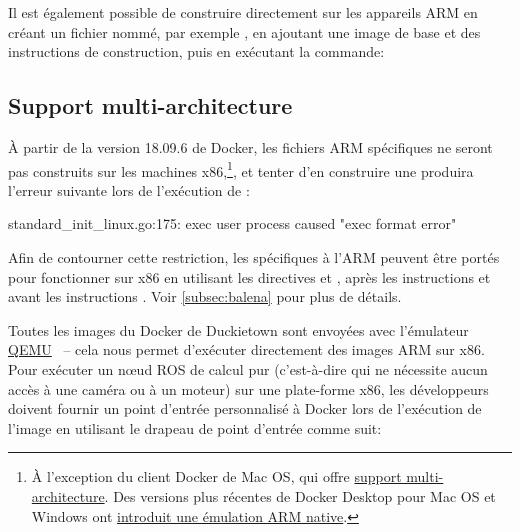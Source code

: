 %
Il est également possible de construire directement sur les appareils ARM en créant un fichier nommé, par exemple , en ajoutant une image de base et des instructions de construction, puis en exécutant la commande:

%
\subsection{Support multi-architecture}

À partir de la version 18.09.6 de Docker, les fichiers ARM spécifiques  ne seront pas construits sur les machines x86,\footnote{À l'exception du client Docker de Mac OS, qui offre \href{https://docs.docker.com/docker-for-mac/multi-arch/}{support multi-architecture}. Des versions plus récentes de Docker Desktop pour Mac OS et Windows ont \href{https://engineering.docker.com/2019/04/multi-arch-images/}{introduit une émulation ARM native}.}, et tenter d'en construire une produira l'erreur suivante lors de l'exécution de :

\begin{pclisting}
standard_init_linux.go:175: exec user process caused "exec format error"
\end{pclisting}
%
Afin de contourner cette restriction, les  spécifiques à l'ARM peuvent être portés pour fonctionner sur x86 en utilisant les directives  et , après les instructions  et avant les instructions . Voir \autoref{subsec:balena} pour plus de détails.

Toutes les images du Docker de Duckietown sont envoyées avec l'émulateur \href{https://www.qemu.org}{QEMU}~\citep{bellard2005qemu} -- cela nous permet d'exécuter directement des images ARM sur x86. Pour exécuter un nœud ROS de calcul pur (c'est-à-dire qui ne nécessite aucun accès à une caméra ou à un moteur) sur une plate-forme x86, les développeurs doivent fournir un point d'entrée personnalisé à Docker lors de l'exécution de l'image en utilisant le drapeau de point d'entrée comme suit:

